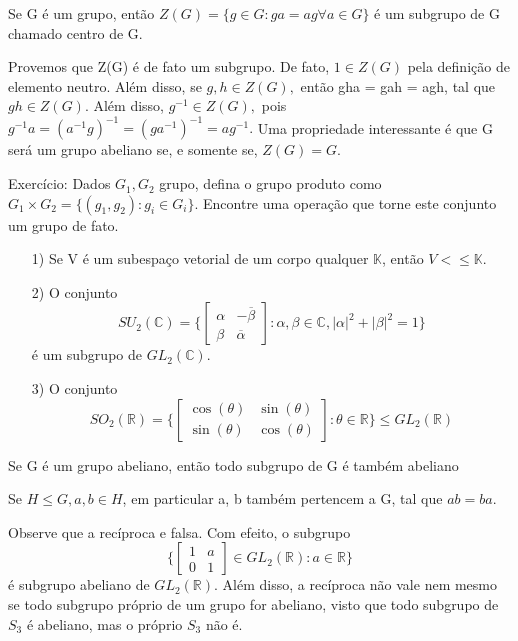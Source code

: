 \documentclass[Algebra/algebra_notes.tex]{subfiles}
\begin{document}
\begin{def*}
	Se G é um grupo, então $Z(G) = \{g\in G: ga = ag\forall a\in{G}\} $ é um subgrupo de G chamado centro de G.
\end{def*}
Provemos que Z(G) é de fato um subgrupo. De fato, $1\in Z(G)$ pela definição de elemento neutro. Além disso, se $g, h\in Z(G),$
então gha = gah = agh, tal que $gh\in Z(G).$ Além disso, $g^{-1}\in Z(G),$ pois $g^{-1}a = (a^{-1}g)^{-1} = (ga^{-1})^{-1} = ag^{-1}.$
Uma propriedade interessante é que G será um grupo abeliano se, e somente se, $Z(G) = G.$
\begin{example*}
	Exercício: Dados $G_{1}, G_{2}$ grupo, defina o grupo produto como $G_{1}\times G_{2} = \{(g_{1}, g_{2}): g_{i}\in G_{i}\}$. Encontre
	uma operação que torne este conjunto um grupo de fato.
\end{example*}
\begin{example*}
	\begin{itemize}
		\item[1)]  Se V é um subespaço vetorial de um corpo qualquer $\mathbb{K}$, então $V<\leq{\mathbb{K}}$.
		\item[2)] O conjunto
		      $$
			      SU_{2}(\mathbb{C}) = \biggl\{ \begin{bmatrix}
				      \alpha & -\overline{\beta} \\
				      \beta  & \overline{\alpha}
			      \end{bmatrix}: \alpha, \beta \in \mathbb{C}, |\alpha|^{2} + |\beta|^{2} = 1\biggr\}
		      $$
		      é um subgrupo de $GL_{2}(\mathbb{C})$.
		\item[3)] O conjunto
		      $$
			      SO_{2}(\mathbb{R}) = \biggl\{\begin{bmatrix}
				      \cos{(\theta)} & \sin{(\theta)} \\
				      \sin{(\theta)} & \cos{(\theta)}
			      \end{bmatrix}: \theta\in \mathbb{R}\biggr\} \leq{GL_{2}(\mathbb{R})}
		      $$
	\end{itemize}
\end{example*}
\begin{prop*}
	Se G é um grupo abeliano, então todo subgrupo de G é também abeliano
\end{prop*}
\begin{proof*}
	Se $H\leq{G}, a, b\in H$, em particular a, b também pertencem a G, tal que $ab = ba.$ \qedsymbol
\end{proof*}
Observe que a recíproca e falsa. Com efeito, o subgrupo
$$
	\biggl\{\begin{bmatrix}
		1 & a \\
		0 & 1
	\end{bmatrix}\in GL_{2}(\mathbb{R}): a\in \mathbb{R}\biggr\}
$$
é subgrupo abeliano de $GL_{2}(\mathbb{R}).$ Além disso, a recíproca não vale nem mesmo se todo subgrupo próprio de um
grupo for abeliano, visto que todo subgrupo de $S_{3}$ é abeliano, mas o próprio $S_{3}$ não é.
\end{document}

